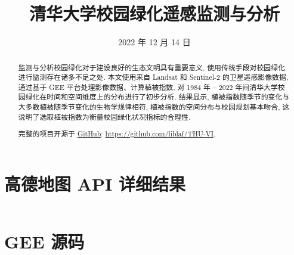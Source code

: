 \documentclass[chinese]{iarticle}
\date{2022 年 12 月 14 日}
\title{清华大学校园绿化遥感监测与分析}
\begin{document}
\begin{abstract}
  监测与分析校园绿化对于建设良好的生态文明具有重要意义, 使用传统手段对校园绿化进行监测存在诸多不足之处.
  本文使用来自 Landsat 和 Sentinel-2 的卫星遥感影像数据, 通过基于 GEE 平台处理影像数据、计算植被指数, 对 1984 年 -- 2022 年间清华大学校园绿化在时间和空间维度上的分布进行了初步分析.
  结果显示, 植被指数随季节的变化与大多数植被随季节变化的生物学规律相符, 植被指数的空间分布与校园规划基本吻合, 这说明了选取植被指数为衡量校园绿化状况指标的合理性.

  完整的项目开源于 \href{https://github.com/liblaf/THU-VI}{GitHub}: \url{https://github.com/liblaf/THU-VI}.
\end{abstract}

\tableofcontents






\printbibliography

\appendix

\section{高德地图 API 详细结果}
\label{app:aoi}

\inputminted[breaklines, breakanywhere]{json}{../data/aoi.json}

\section{GEE 源码}
\label{app:code}

\inputminted[breaklines, breakanywhere]{js}{../src/index.js}
\end{document}
